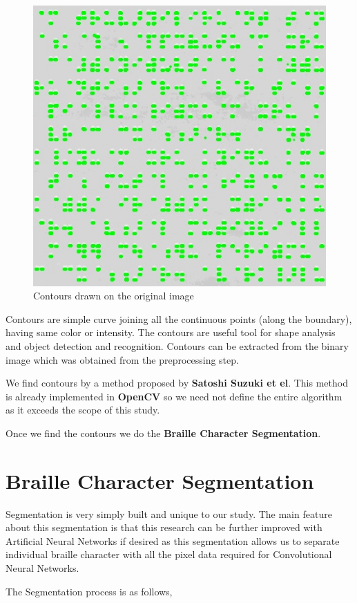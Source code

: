 \documentclass{article}
\begin{document}
\begin{figure}[!htb]
\caption{Contours drawn on the original image}
\centering
\includegraphics[scale=0.4]{contours}
\end{figure}


Contours are simple curve joining all the continuous points (along the boundary), having same color or intensity. The contours are useful tool for shape analysis and object detection and recognition. Contours can be extracted from the binary image which was obtained from the preprocessing step.

We find contours by a method proposed by \textbf{Satoshi Suzuki et el}. This method is already implemented in \textbf{OpenCV} so we need not define the entire algorithm as it exceeds the scope of this study.

Once we find the contours we do the \textbf{Braille Character Segmentation}.


\section{Braille Character Segmentation}


Segmentation is very simply built and unique to our study. The main feature about this segmentation is that this research can be further improved with Artificial Neural Networks if desired as this segmentation allows us to separate individual braille character with all the pixel data required for Convolutional Neural Networks.

The Segmentation process is as follows,
\end{document}
